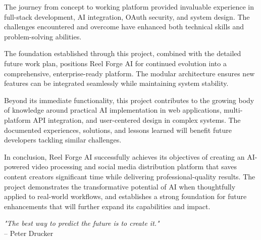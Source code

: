 The journey from concept to working platform provided invaluable experience in full-stack development, AI integration, OAuth security, and system design. The challenges encountered and overcome have enhanced both technical skills and problem-solving abilities.

The foundation established through this project, combined with the detailed future work plan, positions Reel Forge AI for continued evolution into a comprehensive, enterprise-ready platform. The modular architecture ensures new features can be integrated seamlessly while maintaining system stability.

Beyond its immediate functionality, this project contributes to the growing body of knowledge around practical AI implementation in web applications, multi-platform API integration, and user-centered design in complex systems. The documented experiences, solutions, and lessons learned will benefit future developers tackling similar challenges.

\vspace{1cm}

In conclusion, Reel Forge AI successfully achieves its objectives of creating an AI-powered video processing and social media distribution platform that saves content creators significant time while delivering professional-quality results. The project demonstrates the transformative potential of AI when thoughtfully applied to real-world workflows, and establishes a strong foundation for future enhancements that will further expand its capabilities and impact.

\vspace{2cm}

\begin{flushright}
\textit{"The best way to predict the future is to create it."} \\
-- Peter Drucker
\end{flushright}
